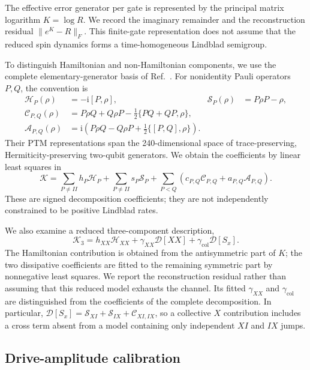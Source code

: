 \documentclass[a4paper,11pt]{article}
\newcommand{\ii}{\mathrm{i}}
\newcommand{\Diss}{\mathcal D}
\newcommand{\Ham}{\mathcal H}
\begin{document}
The effective error generator per gate is represented by the principal
matrix logarithm $K=\log R$. We record the imaginary remainder and the
reconstruction residual $\|e^K-R\|_F$. This finite-gate representation
does not assume that the reduced spin dynamics forms a time-homogeneous
Lindblad semigroup.

To distinguish Hamiltonian and non-Hamiltonian components, we use the
complete elementary-generator basis of Ref.~\cite{Markovian_Errors}.
For nonidentity Pauli operators $P,Q$, the convention is
\begin{align}
 \Ham_P(\rho)&=-\ii[P,\rho], &
 \mathcal S_P(\rho)&=P\rho P-\rho,\\
 \mathcal C_{P,Q}(\rho)&=P\rho Q+Q\rho P
            -\tfrac12\{PQ+QP,\rho\},\\
 \mathcal A_{P,Q}(\rho)&=\ii\left(P\rho Q-Q\rho P
            +\tfrac12\{[P,Q],\rho\}\right).
\end{align}
Their PTM representations span the 240-dimensional space of
trace-preserving, Hermiticity-preserving two-qubit generators. We obtain
the coefficients by linear least squares in
\begin{equation}
 \mathcal K=\sum_{P\ne II}h_P\Ham_P
     +\sum_{P\ne II}s_P\mathcal S_P
     +\sum_{P<Q}\left(c_{P,Q}\mathcal C_{P,Q}
                      +a_{P,Q}\mathcal A_{P,Q}\right).
 \label{eq:methods_full_generator}
\end{equation}
These are signed decomposition coefficients; they are not independently
constrained to be positive Lindblad rates.

We also examine a reduced three-component description,
\begin{equation}
 \mathcal K_3=h_{XX}\Ham_{XX}
           +\gamma_{XX}\Diss[XX]
           +\gamma_{\mathrm{col}}\Diss[S_x].
 \label{eq:methods_reduced_generator}
\end{equation}
The Hamiltonian contribution is obtained from the antisymmetric part of
$K$; the two dissipative coefficients are fitted to the remaining
symmetric part by nonnegative least squares. We report the reconstruction
residual rather than assuming that this reduced model exhausts the
channel. Its fitted $\gamma_{XX}$ and $\gamma_{\mathrm{col}}$ are
distinguished from the coefficients of the complete decomposition.
In particular,
$\Diss[S_x]=\mathcal S_{XI}+\mathcal S_{IX}+\mathcal C_{XI,IX}$,
so a collective $X$ contribution includes a cross term absent from a
model containing only independent $XI$ and $IX$ jumps.

\subsection{Drive-amplitude calibration}
\label{subsec:amplitude_calibration}
\end{document}
